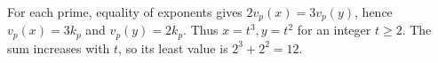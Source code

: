 For each prime, equality of exponents gives $2v_p(x)=3v_p(y)$, hence $v_p(x)=3k_p$ and $v_p(y)=2k_p$. Thus $x=t^3,y=t^2$ for an integer $t\ge2$. The sum increases with $t$, so its least value is $2^3+2^2=\boxed{12}$.
